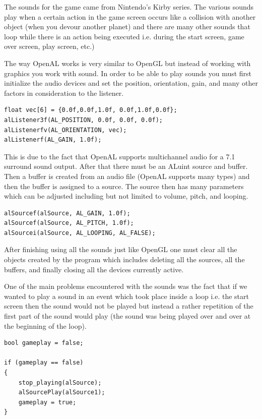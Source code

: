 \documentclass[12pt]{report}
\begin{document}
The sounds for the game came from Nintendo's Kirby series. The various sounds play when a certain action in the game screen occurs like a collision with another object (when you devour another planet) and there are many other sounds that loop while there is an action being executed i.e. during the start screen, game over screen, play screen, etc.) \bigskip

The way OpenAL works is very similar to OpenGL but instead of working with graphics you work with sound. In order to be able to play sounds you must first initialize the audio devices and set the position, orientation, gain, and many other factors in consideration to the listener. \bigskip

\begin{lstlisting}
float vec[6] = {0.0f,0.0f,1.0f, 0.0f,1.0f,0.0f};
alListener3f(AL_POSITION, 0.0f, 0.0f, 0.0f);
alListenerfv(AL_ORIENTATION, vec);
alListenerf(AL_GAIN, 1.0f);
\end{lstlisting}

\medskip This is due to the fact that OpenAL supports multichannel audio for a 7.1 surround sound output. After that there must be an ALuint source and buffer. Then a buffer is created from an audio file (OpenAL supports many types) and then the buffer is assigned to a source. The source then has many parameters which can be adjusted including but not limited to volume, pitch, and looping. \bigskip

\begin{lstlisting}
alSourcef(alSource, AL_GAIN, 1.0f);
alSourcef(alSource, AL_PITCH, 1.0f);
alSourcei(alSource, AL_LOOPING, AL_FALSE);
\end{lstlisting}

\medskip After finishing using all the sounds just like OpenGL one must clear all the objects created by the program which includes deleting all the sources, all the buffers, and finally closing all the devices currently active. \bigskip

One of the main problems encountered with the sounds was the fact that if we wanted to play a sound in an event which took place inside a loop i.e. the start screen then the sound would not be played but instead a rather repetition of the first part of the sound would play (the sound was being played over and over at the beginning of the loop). 

\begin{lstlisting}
bool gameplay = false;

if (gameplay == false)
{
	stop_playing(alSource);
	alSourcePlay(alSource1);
	gameplay = true;
}
\end{lstlisting}
\end{document}
